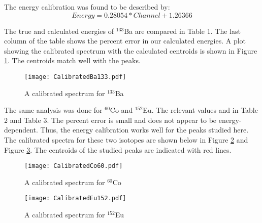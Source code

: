 The energy calibration was found to be described by:
\begin{equation}
Energy = 0.28054 * Channel + 1.26366
\end{equation}

The true and calculated energies of ${}^{133}$Ba are compared in Table 1. The last column of the table shows the percent error in our calculated energies. A plot showing the calibrated spectrum with the calculated centroids is shown in Figure \ref{Ba133spectrum}. The centroids match well with the peaks.



\begin{figure}[h]
\begin{centering}
\texttt{[image: CalibratedBa133.pdf]}
\caption{A calibrated spectrum for ${}^{133}$Ba}
\label{Ba133spectrum}
\end{centering}
\end{figure}
\vspace{5mm}

The same analysis was done for ${}^{60}$Co and ${}^{152}$Eu. The relevant values and in Table 2 and Table 3. The percent error is small and does not appear to be energy-dependent. Thus, the energy calibration works well for the peaks studied here. The calibrated spectra for these two isotopes are shown below in Figure \ref{Co60spectrum} and Figure \ref{Eu152spectrum}. The centroids of the studied peaks are indicated with red lines.

\begin{figure}[h]
\centering
\texttt{[image: CalibratedCo60.pdf]}
\caption{A calibrated spectrum for ${}^{60}$Co}
\label{Co60spectrum}
\vspace{-4.5mm}
\end{figure}

\begin{figure}
\centering
\texttt{[image: CalibratedEu152.pdf]}
\caption{A calibrated spectrum for ${}^{152}$Eu}
\label{Eu152spectrum}
\vspace{-5.0mm}
\end{figure}